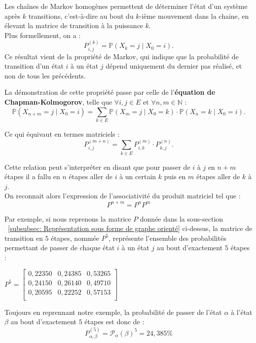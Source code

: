 \documentclass{article}
\begin{document}
Les chaînes de Markov homogènes permettent de déterminer l'état d'un système après $k$ transitions, c'est-à-dire au bout du $k$-ième mouvement dans la chaine, en élevant la matrice de transition à la puissance $k$. \\
Plus formellement, on a :
\[
P_{i,j}^{(k)} = \mathbb{P}(X_k = j \mid X_0 = i).
\]
Ce résultat vient de la propriété de Markov, qui indique que la probabilité de transition d'un état $i$ à un état $j$ dépend uniquement du dernier pas réalisé, et non de tous les précédents.

\begin{tcolorbox}[colback=white,colframe=green!80!black,title=Démonstration]
La démonstration de cette propriété passe par celle de l'\textbf{équation de Chapman-Kolmogorov}, telle que $\forall i,j \in E$ et $\forall n,m \in \mathbb{N}$ :
\[
\mathbb{P}(X_{n+m} = j \mid X_0 = i) = \sum_{k \in E} \mathbb{P}(X_{m} = j \mid X_0 = k) \cdot \mathbb{P}(X_n = k \mid X_0 = i).
\]

Ce qui équivaut en termes matriciels :
\[
P_{i,j}^{(m+n)} = \sum_{k \in E} P_{i,k}^{(m)} \cdot P_{k,j}^{(n)}.
\]

Cette relation peut s'interpréter en disant que pour passer de $i$ à $j$ en $n+m$ étapes il a fallu en $n$ étapes aller de $i$ à un certain $k$ puis en $m$ étapes aller de $k$ à $j$. \\

On reconnait alors l'expression de l'associativité du produit matriciel tel que :
\[
P^{n+m} = P^{n}P^{m}
\]

\end{tcolorbox}

Par exemple, si nous reprenons la matrice $P$ donnée dans la sous-section ~\ref{subsubsec: Représentation sous forme de graphe orienté} ci-dessus, la matrice de transition en $5$ étapes, nommée $P^{5}$, représente l'ensemble des probabilités permettant de passer de chaque état $i$ à un état $j$ au bout d'exactement $5$ étapes :
\begin{center}
$
P^{5} = \begin{bmatrix}
0,22350 & 0,24385 & 0,53265 \\
0,24150 & 0,26140 & 0,49710 \\
0,20595 & 0,22252 & 0,57153 \\
\end{bmatrix}
$
\end{center}
Toujours en reprennant notre exemple, la probabilité de passer de l'état $\alpha$ à l'état $\beta$ au bout d'exactement $5$ étapes est donc de :
\[
P_{\alpha,\beta}^{(5)} = \mathcal{P}_\alpha(\beta)^{5} = 24,385\%
\]
\end{document}
